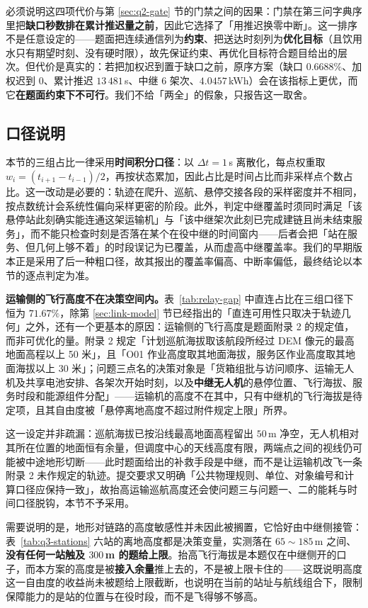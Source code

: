 必须说明这四项代价与第 \ref{sec:q2-gate} 节的门禁之间的因果：门禁在第三问字典序里把\textbf{缺口秒数排在累计推迟量之前}，因此它选择了「用推迟换零中断」。这一排序不是任意设定的——题面把连续通信列为\textbf{约束}、把送达时刻列为\textbf{优化目标}（且饮用水只有期望时刻、没有硬时限），故先保证约束、再优化目标符合题目给出的层次。但代价是真实的：若把加权迟到置于缺口之前，原序方案（缺口 $0.6688\%$、加权迟到 $0$、累计推迟 $13\,481$\,s、中继 6 架次、$4.0457$\,kWh）会在该指标上更优，而它\textbf{在题面约束下不可行}。我们不给「两全」的假象，只报告这一取舍。

\subsection{口径说明}

本节的三组占比一律采用\textbf{时间积分口径}：以 $\Delta t=1$\,s 离散化，每点权重取 $w_i=(t_{i+1}-t_{i-1})/2$，再按状态累加，因此占比是时间占比而非采样点个数占比。这一改动是必要的：轨迹在爬升、巡航、悬停交接各段的采样密度并不相同，按点数统计会系统性偏向采样更密的阶段。此外，判定中继覆盖时须同时满足「该悬停站此刻确实能连通这架运输机」与「该中继架次此刻已完成建链且尚未结束服务」，而不能只检查时刻是否落在某个在役中继的时间窗内——后者会把「站在服务、但几何上够不着」的时段误记为已覆盖，从而虚高中继覆盖率。我们的早期版本正是采用了后一种粗口径，故其报出的覆盖率偏高、中断率偏低，最终结论以本节的逐点判定为准。

\textbf{运输侧的飞行高度不在决策空间内。}表~\ref{tab:relay-gap} 中直连占比在三组口径下恒为 $71.67\%$，除第 \ref{sec:link-model} 节已经指出的「直连可用性只取决于轨迹几何」之外，还有一个更基本的原因：运输侧的飞行高度是题面附录 2 的规定值，而非可优化的量。附录 2 规定「计划巡航海拔取该航段所经过 DEM 像元的最高地面高程以上 50 米」，且「O01 作业高度取其地面海拔，服务区作业高度取其地面海拔以上 30 米」；问题三点名的决策对象是「货箱组批与访问顺序、运输无人机及共享电池安排、各架次开始时刻，以及\textbf{中继无人机}的悬停位置、飞行海拔、服务时段和能源组件分配」——运输机的高度不在其中，只有中继机的飞行海拔是待定项，且其自由度被「悬停离地高度不超过附件规定上限」所界。

这一设定并非疏漏：巡航海拔已按沿线最高地面高程留出 $50$\,m 净空，无人机相对其所在位置的地面恒有余量，但调度中心的天线高度有限，两端点之间的视线仍可能被中途地形切断——此时题面给出的补救手段是中继，而不是让运输机改飞一条附录 2 未作规定的轨迹。提交要求又明确「公共物理规则、单位、对象编号和计算口径应保持一致」，故抬高运输巡航高度还会使问题三与问题一、二的能耗与时间口径脱钩，本节不予采用。

需要说明的是，地形对链路的高度敏感性并未因此被搁置，它恰好由中继侧接管：表~\ref{tab:q3-stations} 六站的离地高度都是决策变量，实测落在 $65\sim185$\,m 之间、\textbf{没有任何一站触及 $300$\,m 的题给上限}。抬高飞行海拔是本题仅在中继侧开的口子，而本方案的高度是被\textbf{接入余量}推上去的，不是被上限卡住的——这既说明高度这一自由度的收益尚未被题给上限截断，也说明在当前的站址与航线组合下，限制保障能力的是站的位置与在役时段，而不是飞得够不够高。


